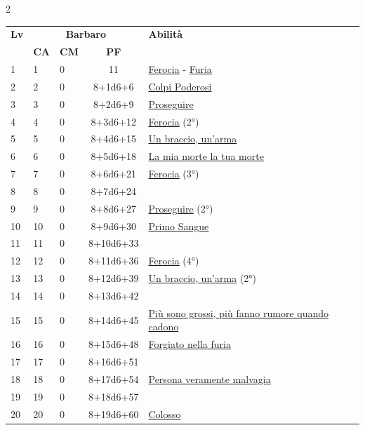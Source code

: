 {\begin{multicols}{2}

\noindent\begin{tabularx}{\linewidth}{p{0.55cm}|p{0.55cm}p{0.55cm}c|X|}
	\toprule
 \rowcolor{gray!20}	\textbf{Lv} & \multicolumn{3}{c|}{\textbf{Barbaro}} & \textbf{Abilità} \\
& \centering\arraybackslash \textbf{CA} & \centering\arraybackslash \textbf{CM} & \centering\arraybackslash \textbf{PF} & \\
	\toprule
	1 & 1 & 0 & 11 & \hyperlink{Ferocia}{Ferocia} - \hyperlink{Furia}{Furia}\\
	\rowcolor{gray!20}2 & 2 & 0 & 8+1d6+6 & \hyperlink{Colpi Poderosi}{Colpi Poderosi}\\
	3 & 3 & 0 & 8+2d6+9 & \hyperlink{Proseguire}{Proseguire}\\
	\rowcolor{gray!20}4 & 4 & 0 & 8+3d6+12 & \hyperlink{Ferocia}{Ferocia} (2°)\\
	5 & 5 & 0 & 8+4d6+15 & \hyperlink{Un braccio, un'arma}{Un braccio, un'arma}\\
	\rowcolor{gray!20}6 & 6 & 0 & 8+5d6+18 & \hyperlink{La mia morte la tua morte}{La mia morte la tua morte}\\
	7 & 7 & 0 & 8+6d6+21 & \hyperlink{Ferocia}{Ferocia} (3°)\\
	\rowcolor{gray!20}8 & 8 & 0 & 8+7d6+24 & \\
	9 & 9 & 0 & 8+8d6+27 & \hyperlink{Proseguire}{Proseguire} (2°)\\
	\rowcolor{gray!20}10 & 10 & 0 & 8+9d6+30 & \hyperlink{Primo Sangue}{Primo Sangue}\\
	11 & 11 & 0 & 8+10d6+33 & \\
	\rowcolor{gray!20}12 & 12 & 0 & 8+11d6+36 & \hyperlink{Ferocia}{Ferocia} (4°)\\
	13 & 13 & 0 & 8+12d6+39 & \hyperlink{Un braccio, un'arma}{Un braccio, un'arma} (2°)\\
	\rowcolor{gray!20}14 & 14 & 0 & 8+13d6+42 & \\
	15 & 15 & 0 & 8+14d6+45 & \hyperlink{Più sono grossi, più fanno rumore quando cadono}{Più sono grossi, più fanno rumore quando cadono}\\
	\rowcolor{gray!20}16 & 16 & 0 & 8+15d6+48 & \hyperlink{Forgiato nella furia}{Forgiato nella furia}\\
	17 & 17 & 0 & 8+16d6+51 & \\
	\rowcolor{gray!20}18 & 18 & 0 & 8+17d6+54 & \hyperlink{Persona veramente malvagia}{Persona veramente malvagia}\\
	19 & 19 & 0 & 8+18d6+57 & \\
	\rowcolor{gray!20}20 & 20 & 0 & 8+19d6+60 & \hyperlink{Colosso}{Colosso}\\
\end{tabularx}


\end{multicols}}
